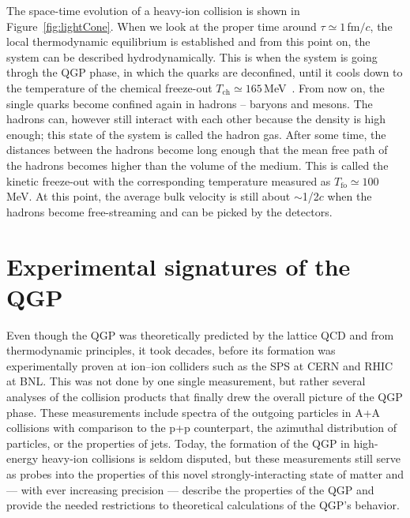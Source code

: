 The space-time evolution of a heavy-ion collision is shown in Figure~\ref{fig:lightCone}. When we look at the proper time around $\tau \simeq 1\,$fm$/c$, the local thermodynamic equilibrium is established and from this point on, the system can be described hydrodynamically. This is when the system is going throgh the QGP phase, in which the quarks are deconfined, until it cools down to the temperature of the chemical freeze-out $T_\mathrm{ch} \simeq 165\,$MeV~\cite{ALICE_lightFlavor,STAR_LightFlavor}\@. From now on, the single quarks become confined again in hadrons -- baryons and mesons. The hadrons can, however still interact with each other because the density is high enough; this state of the system is called the hadron gas. After some time, the distances between the hadrons become long enough that the mean free path of the hadrons becomes higher than the volume of the medium. This is called the kinetic freeze-out with the corresponding temperature measured as $T_\mathrm{fo} \simeq 100\,$MeV. At this point, the average bulk velocity is still about $\sim$1/2$c$ when the hadrons become free-streaming and can be picked by the detectors.





\section{Experimental signatures of the QGP}
Even though the QGP was theoretically predicted by the lattice QCD and from thermodynamic principles, it took decades, before its formation was experimentally proven at ion--ion colliders such as the SPS at CERN and RHIC at BNL\@.  
This was not done by one single measurement, but rather several analyses of the collision products that finally drew the overall picture of the QGP phase. These measurements include spectra of the outgoing particles in A+A collisions with comparison to the p+p counterpart, the azimuthal distribution of particles, or the properties of jets. Today, the formation of the QGP in high-energy heavy-ion collisions is seldom disputed, but these measurements still serve as probes into the properties of this novel strongly-interacting state of matter and --- with ever increasing precision --- describe the properties of the QGP and provide the needed restrictions to theoretical calculations of the QGP's behavior.

